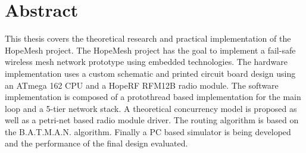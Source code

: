 \chapter*{Abstract}
This thesis covers the theoretical research and practical implementation of the HopeMesh project. The HopeMesh project has the goal to implement a fail-safe wireless mesh network prototype using embedded technologies. The hardware implementation uses a custom schematic and printed circuit board design using an ATmega 162 CPU and a HopeRF RFM12B radio module. The software implementation is composed of a protothread based implementation for the main loop and a 5-tier network stack. A theoretical concurrency model is proposed as well as a petri-net based radio module driver. The routing algorithm is based on the B.A.T.M.A.N. algorithm. Finally a PC based simulator is being developed and the performance of the final design evaluated.
